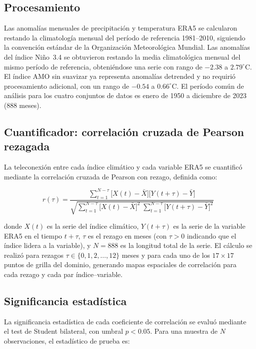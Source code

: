 \documentclass[12pt, a4paper]{article}
\begin{document}
\subsection{Procesamiento}

Las anomalías mensuales de precipitación y temperatura ERA5 se calcularon
restando la climatología mensual del período de referencia 1981--2010, siguiendo
la convención estándar de la Organización Meteorológica Mundial. Las anomalías
del índice Niño~3.4 se obtuvieron restando la media climatológica mensual del
mismo período de referencia, obteniéndose una serie con rango de $-2.38$ a
$2.79^\circ$C. El índice AMO sin suavizar ya representa anomalías detrended y
no requirió procesamiento adicional, con un rango de $-0.54$ a $0.66^\circ$C.
El período común de análisis para los cuatro conjuntos de datos es enero de
1950 a diciembre de 2023 (888 meses).

\subsection{Cuantificador: correlación cruzada de Pearson rezagada}

La teleconexión entre cada índice climático y cada variable ERA5 se cuantificó
mediante la correlación cruzada de Pearson con rezago, definida como:

\begin{equation}
	r(\tau) = \frac{\displaystyle\sum_{t=1}^{N-\tau}
		\bigl[X(t) - \bar{X}\bigr]\bigl[Y(t+\tau) - \bar{Y}\bigr]}
	{\displaystyle\sqrt{\sum_{t=1}^{N-\tau}\bigl[X(t)-\bar{X}\bigr]^2\;
			\sum_{t=1}^{N-\tau}\bigl[Y(t+\tau)-\bar{Y}\bigr]^2}}
	\label{eq:pearson}
\end{equation}

\noindent donde $X(t)$ es la serie del índice climático, $Y(t+\tau)$ es la
serie de la variable ERA5 en el tiempo $t+\tau$, $\tau$ es el rezago en meses
(con $\tau > 0$ indicando que el índice lidera a la variable), y $N = 888$ es
la longitud total de la serie. El cálculo se realizó para rezagos
$\tau \in \{0, 1, 2, \ldots, 12\}$ meses y para cada uno de los $17 \times 17$
puntos de grilla del dominio, generando mapas espaciales de correlación para
cada rezago y cada par índice--variable.

\subsection{Significancia estadística}

La significancia estadística de cada coeficiente de correlación se evaluó
mediante el test de Student bilateral, con umbral $p < 0.05$. Para una muestra
de $N$ observaciones, el estadístico de prueba es:
\end{document}
